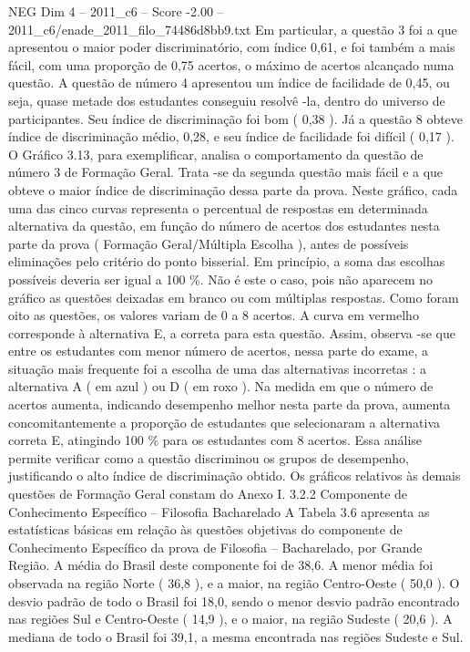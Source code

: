 \begin{textsample}{NEG Dim 4 – 2011\_c6 – Score -2.00 – 2011\_c6/enade\_2011\_filo\_74486d8bb9.txt}
Em particular, a questão 3 foi a que apresentou o maior poder discriminatório, com índice 0,61, e foi também a mais fácil, com uma proporção de 0,75 acertos, o máximo de acertos alcançado numa questão.
A questão de número 4 apresentou um índice de facilidade de 0,45, ou seja, quase metade dos estudantes conseguiu resolvê -la, dentro do universo de participantes.
Seu índice de discriminação foi bom ( 0,38 ).
Já a questão 8 obteve índice de discriminação médio, 0,28, e seu índice de facilidade foi difícil ( 0,17 ).
O Gráfico 3.13, para exemplificar, analisa o comportamento da questão de número 3 de Formação Geral.
Trata -se da segunda questão mais fácil e a que obteve o maior índice de discriminação dessa parte da prova.
Neste gráfico, cada uma das cinco curvas representa o percentual de respostas em determinada alternativa da questão, em função do número de acertos dos estudantes nesta parte da prova ( Formação Geral/Múltipla Escolha ), antes de possíveis eliminações pelo critério do ponto bisserial.
Em princípio, a soma das escolhas possíveis deveria ser igual a 100 \%.
Não é este o caso, pois não aparecem no gráfico as questões deixadas em branco ou com múltiplas respostas.
Como foram oito as questões, os valores variam de 0 a 8 acertos.
A curva em vermelho corresponde à alternativa E, a correta para esta questão.
Assim, observa -se que entre os estudantes com menor número de acertos, nessa parte do exame, a situação mais frequente foi a escolha de uma das alternativas incorretas : a alternativa A ( em azul ) ou D ( em roxo ).
Na medida em que o número de acertos aumenta, indicando desempenho melhor nesta parte da prova, aumenta concomitantemente a proporção de estudantes que selecionaram a alternativa correta E, atingindo 100 \% para os estudantes com 8 acertos.
Essa análise permite verificar como a questão discriminou os grupos de desempenho, justificando o alto índice de discriminação obtido.
Os gráficos relativos às demais questões de Formação Geral constam do Anexo I. 3.2.2 Componente de Conhecimento Específico – Filosofia Bacharelado A Tabela 3.6 apresenta as estatísticas básicas em relação às questões objetivas do componente de Conhecimento Específico da prova de Filosofia – Bacharelado, por Grande Região.
A média do Brasil deste componente foi de 38,6.
A menor média foi observada na região Norte ( 36,8 ), e a maior, na região Centro-Oeste ( 50,0 ).
O desvio padrão de todo o Brasil foi 18,0, sendo o menor desvio padrão encontrado nas regiões Sul e Centro-Oeste ( 14,9 ), e o maior, na região Sudeste ( 20,6 ).
A mediana de todo o Brasil foi 39,1, a mesma encontrada nas regiões Sudeste e Sul.

\end{textsample}
